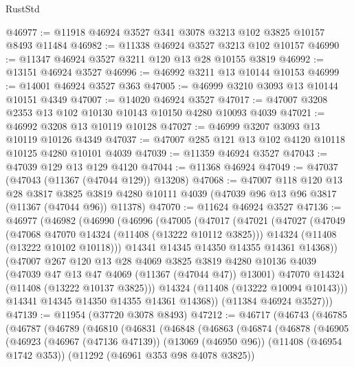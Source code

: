 \begin{lexlean}{RustStd}
\begin{coremodule}
@46977 := @11918 @46924 @3527 @341 @3078 @3213 @102 @3825 @10157 @8493 @11484
@46982 := @11338 @46924 @3527 @3213 @102 @10157
@46990 := @11347 @46924 @3527 @3211 @120 @13 @28 @10155 @3819
@46992 := @13151 @46924 @3527
@46996 := @46992 @3211 @13 @10144 @10153
@46999 := @14001 @46924 @3527 @363
@47005 := @46999 @3210 @3093 @13 @10144 @10151 @4349
@47007 := @14020 @46924 @3527
@47017 := @47007 @3208 @2353 @13 @102 @10130 @10143 @10150 @4280 @10093 @4039
@47021 := @46992 @3208 @13 @10119 @10128
@47027 := @46999 @3207 @3093 @13 @10119 @10126 @4349
@47037 := @47007 @285 @121 @13 @102 @4120 @10118 @10125 @4280 @10101 @4039
@47039 := @11359 @46924 @3527
@47043 := @47039 @129 @13 @129 @4120
@47044 := @11368 @46924
@47049 := @47037 (@47043 (@11367 (@47044 @129)) @13208)
@47068 := @47007
    @118
    @120
    @13
    @28
    @3817
    @3825
    @3819
    @4280
    @10111
    @4039
    (@47039 @96 @13 @96 @3817 (@11367 (@47044 @96)) @11378)
@47070 := @11624 @46924 @3527
@47136 := @46977
    (@46982
      (@46990
        (@46996
          (@47005
            (@47017
              (@47021
                (@47027
                  (@47049
                    (@47068 @47070 @14324 (@11408 (@13222 @10112 @3825)))
                    @14324
                    (@11408 (@13222 @10102 @10118)))
                  @14341
                  @14345
                  @14350
                  @14355
                  @14361
                  @14368))
              (@47007
                @267
                @120
                @13
                @28
                @4069
                @3825
                @3819
                @4280
                @10136
                @4039
                (@47039 @47 @13 @47 @4069 (@11367 (@47044 @47)) @13001)
                @47070
                @14324
                (@11408 (@13222 @10137 @3825)))
              @14324
              (@11408 (@13222 @10094 @10143)))
            @14341
            @14345
            @14350
            @14355
            @14361
            @14368))
        (@11384 @46924 @3527)))
@47139 := @11954 (@37720 @3078 @8493)
@47212 := @46717
    (@46743
      (@46785
        (@46787
          (@46789
            (@46810
              (@46831
                (@46848
                  (@46863
                    (@46874
                      (@46878
                        (@46905
                          (@46923
                            (@46967 (@47136 @47139))
                            (@13069 (@46950 @96))
                            (@11408 (@46954 @1742 @353))
                            (@11292 (@46961 @353 @98 @4078 @3825))

\end{coremodule}
\end{lexlean}

